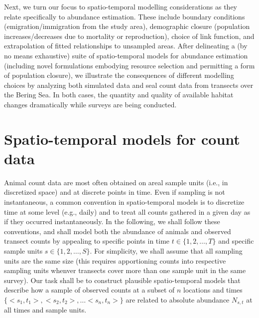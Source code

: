\documentclass[times,mee,doublespace,]{besauth2}
\begin{document}
Next, we turn our focus to spatio-temporal modelling considerations as they relate specifically to abundance estimation.  These include boundary conditions (emigration/immigration from the study area), demographic closure (population increases/decreases due to mortality or reproduction), choice of link function, and extrapolation of fitted relationships to unsampled areas. After delineating a (by no means exhaustive) suite of spatio-temporal models for abundance estimation (including novel formulations embodying resource selection and permitting a form of population closure), we illustrate the consequences of different modelling choices by analyzing both simulated data and seal count data from transects over the Bering Sea. In both cases, the quantity and quality of available habitat changes dramatically while surveys are being conducted.

\section{Spatio-temporal models for count data}

Animal count data are most often obtained on areal sample units (i.e., in discretized space) and at discrete points in time.  Even if sampling is not instantaneous, a common convention in spatio-temporal models is to discretize time at some level (e.g., daily) and to treat all counts gathered in a given day as if they occurred instantaneously. In the following, we shall follow these conventions, and shall model both the abundance of animals and observed transect counts by appealing to specific points in time $t \in  \{ 1,2,\hdots,T \} $ and specific sample units $s \in \{ 1,2,\hdots,S \}$.  For simplicity, we shall assume that all sampling units are the same size (this requires apportioning counts into respective sampling units whenver transects cover more than one sample unit in the same survey).  Our task shall be to construct plausible spatio-temporal models that describe how a sample of observed counts at a subset of $n$ locations and times $\{ <s_1,t_1>,<s_2,t_2>,\hdots <s_n,t_n> \}$ are related to absolute abundance $N_{s,t}$ at all times and sample units.
\end{document}
